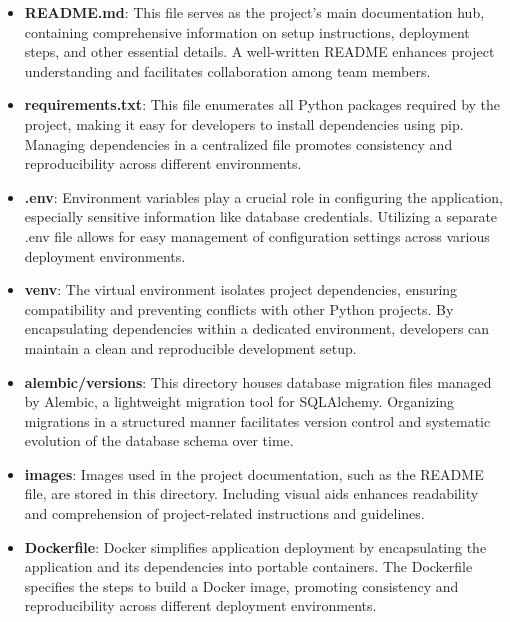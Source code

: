 \begin{itemize}
    \item \textbf{README.md}: This file serves as the project's main documentation hub, containing comprehensive information on setup instructions, deployment steps, and other essential details. A well-written README enhances project understanding and facilitates collaboration among team members.

    \item \textbf{requirements.txt}: This file enumerates all Python packages required by the project, making it easy for developers to install dependencies using pip. Managing dependencies in a centralized file promotes consistency and reproducibility across different environments.

    \item \textbf{.env}: Environment variables play a crucial role in configuring the application, especially sensitive information like database credentials. Utilizing a separate .env file allows for easy management of configuration settings across various deployment environments.

    \item \textbf{venv}: The virtual environment isolates project dependencies, ensuring compatibility and preventing conflicts with other Python projects. By encapsulating dependencies within a dedicated environment, developers can maintain a clean and reproducible development setup.

    \item \textbf{alembic/versions}: This directory houses database migration files managed by Alembic, a lightweight migration tool for SQLAlchemy. Organizing migrations in a structured manner facilitates version control and systematic evolution of the database schema over time.

    \item \textbf{images}: Images used in the project documentation, such as the README file, are stored in this directory. Including visual aids enhances readability and comprehension of project-related instructions and guidelines.

    \item \textbf{Dockerfile}: Docker simplifies application deployment by encapsulating the application and its dependencies into portable containers. The Dockerfile specifies the steps to build a Docker image, promoting consistency and reproducibility across different deployment environments.
\end{itemize}

